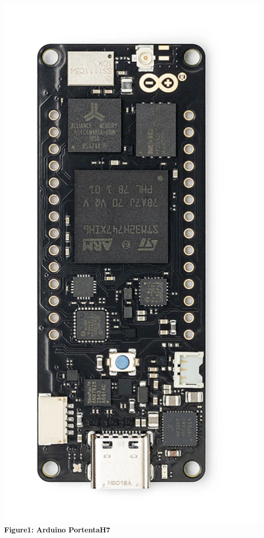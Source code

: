 \documentclass[10pt, a4paper]{beamer}
\begin{document}
\begin{frame}
		\begin{columns}
			\centering
			\includegraphics[width=\textwidth]{images/ArduinoPortentaH7.png}
			\vspace{0.2cm}
			\textbf{Figure1: Arduino PortentaH7}
			

\end{columns}
\end{frame}
\end{document}
